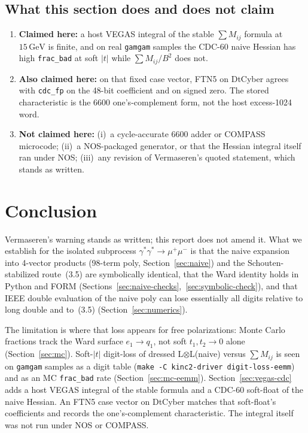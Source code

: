 \documentclass[11pt]{article}
\begin{document}
\subsection{What this section does and does not claim}
\label{sec:vegas-cdc-claims}

\begin{enumerate}
  \item \textbf{Claimed here:} a host VEGAS integral of the stable
    $\sum M_{ij}$ formula at $15\,\mathrm{GeV}$ is finite, and on real
    \texttt{gamgam} samples the CDC-60 naive Hessian has high
    \texttt{frac\_bad} at soft $|t|$ while $\sum M_{ij}/B^2$ does not.
  \item \textbf{Also claimed here:} on that fixed case vector, FTN5
    on DtCyber agrees with \texttt{cdc\_fp} on the 48-bit coefficient
    and on signed zero. The stored characteristic is the 6600
    one's-complement form, not the host excess-1024 word.
  \item \textbf{Not claimed here:} (i)~a cycle-accurate 6600 adder or
    COMPASS microcode; (ii)~a NOS-packaged generator, or that the
    Hessian integral itself ran under NOS; (iii)~any revision of
    Vermaseren's quoted statement, which stands as written.
\end{enumerate}

\section{Conclusion}
\label{sec:conclusion}

Vermaseren's warning stands as written; this report does not amend it.
What we establish for the isolated subprocess
$\gamma^*\gamma^*\to\mu^+\mu^-$ is that the naive expansion into
4-vector products (98-term poly, Section~\ref{sec:naive}) and the
Schouten-stabilized route~(3.5) are symbolically identical, that the
Ward identity holds in Python and FORM
(Sections~\ref{sec:naive-checks},~\ref{sec:symbolic-check}), and that
IEEE double evaluation of the naive poly can lose essentially all
digits relative to long double and to~(3.5)
(Section~\ref{sec:numerics}).

The limitation is where that loss appears for free polarizations:
Monte Carlo fractions track the Ward surface $e_1\to q_1$, not soft
$t_1,t_2\to0$ alone (Section~\ref{sec:mc}). Soft-$|t|$ digit-loss of
dressed L$\otimes$L(naive) versus $\sum M_{ij}$ is seen on
\texttt{gamgam} samples as a digit table
(\texttt{make -C kinc2-driver digit-loss-eemm}) and as an MC
\texttt{frac\_bad} rate (Section~\ref{sec:mc-eemm}).
Section~\ref{sec:vegas-cdc} adds a host VEGAS integral of the stable
formula and a CDC-60 soft-float of the naive Hessian. An FTN5 case
vector on DtCyber matches that soft-float's coefficients and records
the one's-complement characteristic. The integral itself was not run
under NOS or COMPASS.
\end{document}
